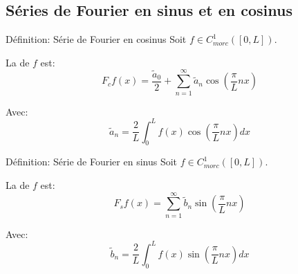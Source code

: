\documentclass[a4paper]{article}
\begin{document}
\subsection{Séries de Fourier en sinus et en cosinus}
\begin{parag}{Définition: Série de Fourier en cosinus}
    Soit $f \in C_{morc}^1\left(\left[0, L\right]\right)$.

    La  de $f$ est: 
    \[F_c f\left(x\right) = \frac{\widetilde{a}_0}{2} + \sum_{n=1}^{\infty} \widetilde{a}_n \cos\left(\frac{\pi}{L} nx\right)\]
    
    Avec: 
    \[\widetilde{a}_n = \frac{2}{L} \int_{0}^{L} f\left(x\right) \cos\left(\frac{\pi}{L}nx\right)dx\]
\end{parag}

\begin{parag}{Définition: Série de Fourier en sinus}
    Soit $f \in C_{morc}^1\left(\left[0, L\right]\right)$.

    La  de $f$ est: 
    \[F_s f\left(x\right) = \sum_{n=1}^{\infty} \widetilde{b}_n \sin\left(\frac{\pi}{L} nx\right)\]
    
    Avec: 
    \[\widetilde{b}_n = \frac{2}{L} \int_{0}^{L} f\left(x\right) \sin\left(\frac{\pi}{L}nx\right)dx\]
\end{parag}
\end{document}
